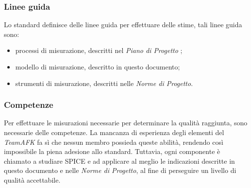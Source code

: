 \subsubsection{Linee guida}
Lo standard definisce delle linee guida per effettuare delle stime, tali linee guida sono:
\begin{itemize}
	\item processi di misurazione, descritti nel \textit{Piano di Progetto} ;
	\item modello di misurazione, descritto in questo documento;
	\item strumenti di misurazione, descritti nelle \textit{Norme di Progetto}.
\end{itemize}

\subsubsection{Competenze}
Per effettuare le misurazioni necessarie per determinare la qualità raggiunta, sono necessarie delle competenze. La mancanza di esperienza degli elementi del \textit{TeamAFK} fa sì che nessun membro possieda queste abilità, rendendo così impossibile la piena adesione allo standard. Tuttavia, ogni componente è chiamato a studiare SPICE e ad applicare al meglio le indicazioni descritte in questo documento e nelle \textit{Norme di Progetto}, al fine di perseguire un livello di qualità accettabile.






